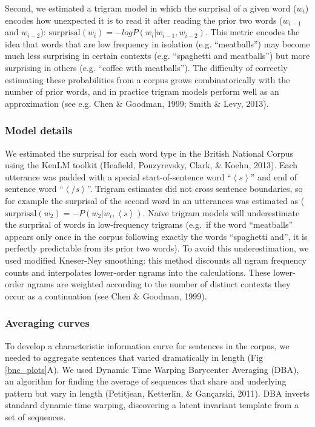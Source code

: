 \documentclass[10pt, letterpaper]{article}
\begin{document}
Second, we estimated a trigram model in which the surprisal of a given
word (\(w_i\)) encodes how unexpected it is to read it after reading the
prior two words (\(w_{i-1}\) and \(w_{i-2}\)):
\(\text{surprisal}(w_{i}) = -log P(w_i|w_{i-1},w_{i-2})\). This metric
encodes the idea that words that are low frequency in isolation (e.g.
``meatballs'') may become much less surprising in certain contexts (e.g.
``spaghetti and meatballs'') but more surprising in others (e.g.
``coffee with meatballs''). The difficulty of correctly estimating these
probabilities from a corpus grows combinatorically with the number of
prior words, and in practice trigram models perform well as an
approximation (see e.g. Chen \& Goodman, 1999; Smith \& Levy, 2013).

\hypertarget{model-details}{%
\subsubsection{Model details}\label{model-details}}

We estimated the surprisal for each word type in the British National
Corpus using the KenLM toolkit (Heafield, Pouzyrevsky, Clark, \& Koehn,
2013). Each utterance was padded with a special start-of-sentence word
``\(\left<s\right>\)'' and end of sentence word ``\(\left</s\right>\)''.
Trigram estimates did not cross sentence boundaries, so for example the
surprisal of the second word in an utterances was estimated as
(\(\text{surprisal}(w_{2}) = -P(w_2|w_{i},\left<s\right>)\). Naïve
trigram models will underestimate the surprisal of words in
low-frequency trigrams (e.g.~if the word ``meatballs'' appears only once
in the corpus following exactly the words ``spaghetti and'', it is
perfectly predictable from its prior two words). To avoid this
underestimation, we used modified Kneser-Ney smoothing: this method
discounts all ngram frequency counts and interpolates lower-order ngrams
into the calculations. These lower-order ngrams are weighted according
to the number of distinct contexts they occur as a continuation (see
Chen \& Goodman, 1999).

\hypertarget{averaging-curves}{%
\subsubsection{Averaging curves}\label{averaging-curves}}

To develop a characteristic information curve for sentences in the
corpus, we needed to aggregate sentences that varied dramatically in
length (Fig \ref{bnc_plots}A). We used Dynamic Time Warping Barycenter
Averaging (DBA), an algorithm for finding the average of sequences that
share and underlying pattern but vary in length (Petitjean, Ketterlin,
\& Gançarski, 2011). DBA inverts standard dynamic time warping,
discovering a latent invariant template from a set of sequences.
\end{document}

